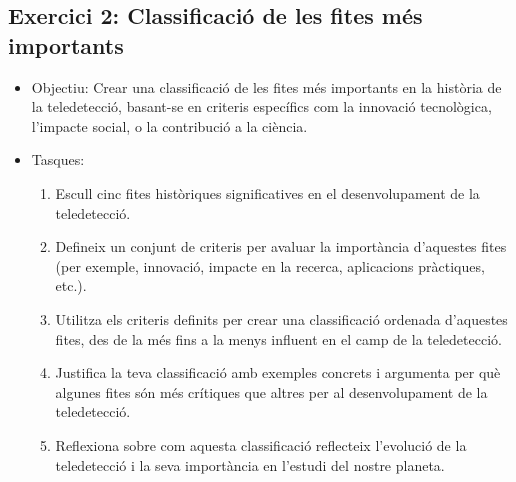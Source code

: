 \documentclass[
]{book}
\providecommand{\tightlist}{%
  \setlength{\itemsep}{0pt}\setlength{\parskip}{0pt}}
\begin{document}
\hypertarget{exercici-2-classificaciuxf3-de-les-fites-muxe9s-importants}{%
\subsection*{Exercici 2: Classificació de les fites més importants}\label{exercici-2-classificaciuxf3-de-les-fites-muxe9s-importants}}

\begin{itemize}
\tightlist
\item
  Objectiu: Crear una classificació de les fites més importants en la història de la teledetecció, basant-se en criteris específics com la innovació tecnològica, l'impacte social, o la contribució a la ciència.
\item
  Tasques:

  \begin{enumerate}
  \def\labelenumi{\arabic{enumi}.}
  \tightlist
  \item
    Escull cinc fites històriques significatives en el desenvolupament de la teledetecció.
  \item
    Defineix un conjunt de criteris per avaluar la importància d'aquestes fites (per exemple, innovació, impacte en la recerca, aplicacions pràctiques, etc.).
  \item
    Utilitza els criteris definits per crear una classificació ordenada d'aquestes fites, des de la més fins a la menys influent en el camp de la teledetecció.
  \item
    Justifica la teva classificació amb exemples concrets i argumenta per què algunes fites són més crítiques que altres per al desenvolupament de la teledetecció.
  \item
    Reflexiona sobre com aquesta classificació reflecteix l'evolució de la teledetecció i la seva importància en l'estudi del nostre planeta.
  \end{enumerate}
\end{itemize}

  
\end{document}
